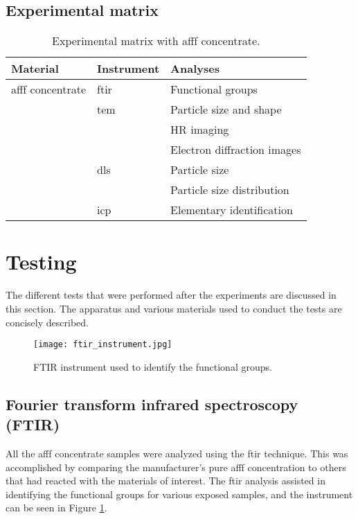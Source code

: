 \subsection{Experimental matrix}

\begin{table}[H]
\centering
\caption{Experimental matrix with \acrshort{afff} concentrate.}

\renewcommand{\arraystretch}{1.5}
\begin{tabularx}{\textwidth}{ XXX }
    \hline
    Material & Instrument & Analyses \\
    \hline
    \acrshort{afff} concentrate & \acrshort{ftir} & Functional groups \\
    & \acrshort{tem} & Particle size and shape \\
    & & HR imaging \\
    & & Electron diffraction images \\
    & \acrshort{dls} & Particle size \\
    & & Particle size distribution \\
    & \acrshort{icp} & Elementary identification \\
    \hline
\end{tabularx}

\end{table}

\section{Testing} 
The different tests that were performed after the experiments are discussed in this section. The apparatus and various materials used to conduct the tests are concisely described.

\vskip 12pt

\begin{figure}[H]
    \centering
    \texttt{[image: ftir\_instrument.jpg]}
    \caption{FTIR instrument used to identify the functional groups.}
    \label{ch4:figure:ftir}
\end{figure}

\subsection{Fourier transform infrared spectroscopy (FTIR)}
All the \acrshort{afff} concentrate samples were analyzed using the \acrshort{ftir} technique. This was accomplished by comparing the manufacturer's pure \acrshort{afff} concentration to others that had reacted with the materials of interest. The \acrshort{ftir} analysis assisted in identifying the functional groups for various exposed samples, and the instrument can be seen in Figure \ref{ch4:figure:ftir}.

